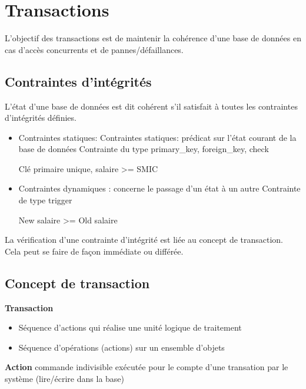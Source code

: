 \documentclass[12pt,a4paper,openany]{book}
\begin{document}
\chapter{Transactions}
L'objectif des transactions est de maintenir la cohérence d'une base de données en cas 
d'accès concurrents et de pannes/défaillances. 

\section{Contraintes d'intégrités}
L'état  d'une  base  de  données  est  dit  cohérent  s'il  satisfait  à  toutes  les  contraintes 
d'intégrités définies.  

\begin{itemize}
	\item Contraintes statiques: Contraintes statiques: prédicat sur l'état courant de la base de données 
		Contrainte du type primary\_key, foreign\_key, check 
		\begin{exemple}
			Clé primaire unique, salaire >= SMIC
		\end{exemple}
	\item Contraintes dynamiques : concerne le passage d'un état à un autre 
		Contrainte de type trigger 
		\begin{exemple}
			New salaire >= Old salaire
		\end{exemple}
\end{itemize}
La vérification d'une contrainte d'intégrité est liée au concept de transaction. Cela peut se faire de 
façon immédiate ou différée.  

\section{Concept de transaction}
\begin{definition}
	\textbf{Transaction}

	\begin{itemize}
		\item Séquence d'actions qui réalise une unité logique de traitement 
		\item Séquence d'opérations (actions) sur un ensemble d'objets 
	\end{itemize}
\end{definition}

\begin{definition}
	\textbf{Action} commande indivisible exécutée pour le compte d'une transation par le système (lire/écrire 
	dans la base)
\end{definition}
\end{document}
